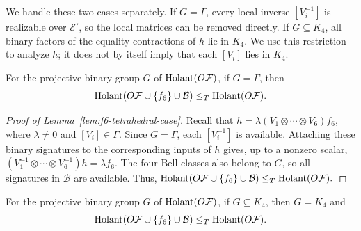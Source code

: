 We handle these two cases separately.
If $G=\Gamma$, every local inverse $[V_i^{-1}]$ is realizable
over $\mathcal E'$, so the local matrices can be removed directly.
If $G\subseteq K_4$, all binary factors of the equality contractions
of $h$ lie in $K_4$. We use this restriction to analyze $h$;
it does not by itself imply that each $[V_i]$ lies in $K_4$.

\begin{lemma}
\label{lem:f6-tetrahedral-case}
For the projective binary group $G$ of $\operatorname{Holant}(O\mathcal{F})$,
if $G=\Gamma$, then
\[
\operatorname{Holant}(O\mathcal F\cup\{f_6\}\cup\mathcal B)
\leq_T\operatorname{Holant}(O\mathcal F).
\]
\end{lemma}
\begin{proof}[Proof of Lemma~\ref{lem:f6-tetrahedral-case}]
Recall that
$h=\lambda(V_1\otimes\cdots\otimes V_6)f_6$, where
$\lambda\ne0$ and $[V_i]\in\Gamma$.
Since $G=\Gamma$, each $[V_i^{-1}]$ is available.
Attaching these binary signatures to the corresponding inputs of $h$
gives, up to a nonzero scalar,
$
(V_1^{-1}\otimes\cdots\otimes V_6^{-1})h=\lambda f_6.
$
The four Bell classes also belong to $G$, so all signatures in
$\mathcal B$ are available.
Thus,
$
\operatorname{Holant}(O\mathcal F\cup\{f_6\}\cup\mathcal B)
\leq_T\operatorname{Holant}(O\mathcal F).
$
\end{proof}

\begin{lemma}
\label{lem:f6-klein-case}
For the projective binary group $G$ of $\operatorname{Holant}(O\mathcal{F})$,
if $G\subseteq K_4$, then $G=K_4$ and 
\[
\operatorname{Holant}(O\mathcal F\cup\{f_6\}\cup\mathcal B)
\leq_T\operatorname{Holant}(O\mathcal F).
\]
\end{lemma}


